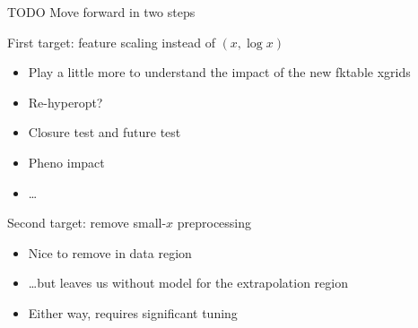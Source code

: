 \documentclass[aspectratio=169, 8pt,t]{beamer}
\begin{document}
\begin{frame}{TODO}
  Move forward in two steps \\ \vspace*{1em}

  First target: feature scaling instead of $(x,\log x)$
  \begin{itemize}
    \item Play a little more to understand the impact of the new fktable xgrids
    \item Re-hyperopt?
    \item Closure test and future test
    \item Pheno impact
    \item \ldots
  \end{itemize}

  \vspace*{1em}

  Second target: remove small-$x$ preprocessing
  \begin{itemize}
    \item Nice to remove in data region
    \item \ldots but leaves us without model for the extrapolation region
    \item Either way, requires significant tuning
  \end{itemize}
\end{frame}
\end{document}
